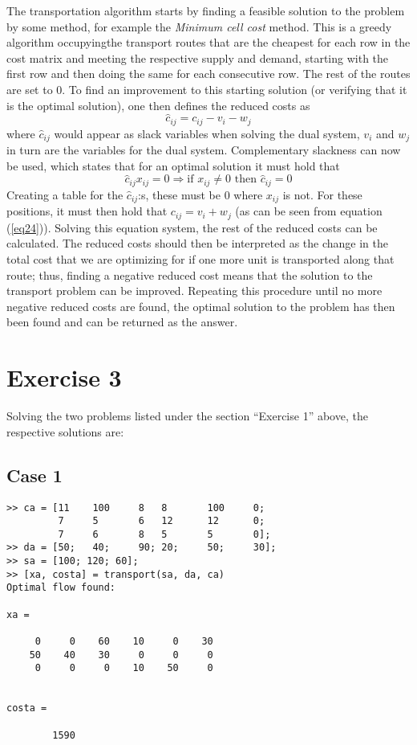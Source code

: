 \documentclass{article}
\begin{document}
  \noindent
  The transportation algorithm starts by finding a feasible solution to the
  problem by some method, for example the \textit{Minimum cell cost}
  method. This is a greedy algorithm occupying\q the
  transport routes that are the cheapest for each row in the cost matrix and
  meeting the respective supply and demand, starting with the first row and
  then doing the same for each consecutive row. The rest of the routes are set
  to 0.  To find an improvement to this starting solution (or verifying that it
  is the optimal solution), one then defines the reduced costs as
  \begin{equation}
    \hat{c}_{ij} = c_{ij} - v_i - w_j
    \label{eq24}
  \end{equation}
  where $\hat{c}_{ij}$ would appear as slack variables when solving the dual
  system, $v_i$ and $w_j$ in turn are the variables for the dual system.
  Complementary slackness can now be used, which states that for an optimal
  solution it must hold that
  \begin{equation}
    \hat{c}_{ij}x_{ij} = 0 \Rightarrow \text{if } x_{ij} \neq 0 \text{ then } \hat{c}_{ij} = 0
  \end{equation}
  Creating a table for the $\hat{c}_{ij}$:s, these must be 0 where $x_{ij}$ is
  not. For these positions, it must then hold that $c_{ij} = v_i + w_j$ (as can
  be seen from equation (\ref{eq24})). Solving this equation system, the rest
  of the reduced costs can be calculated. The reduced costs should then be
  interpreted as the change in the total cost that we are optimizing for if one
  more unit is transported along that route; thus, finding a negative reduced
  cost means that the solution to the transport problem can be improved.
  Repeating this procedure until no more negative reduced costs are found, the
  optimal solution to the problem has then been found and can be returned as
  the answer.

  \section*{Exercise 3}
  Solving the two problems listed under the section ``Exercise 1'' above, the
  respective solutions are:

  \subsection*{Case 1}
  \begin{lstlisting}
>> ca = [11    100     8   8       100     0;
         7     5       6   12      12      0;
         7     6       8   5       5       0];
>> da = [50;   40;     90; 20;     50;     30];
>> sa = [100; 120; 60];
>> [xa, costa] = transport(sa, da, ca)
Optimal flow found:

xa =

     0     0    60    10     0    30
    50    40    30     0     0     0
     0     0     0    10    50     0


costa =

        1590
  \end{lstlisting}
\end{document}
